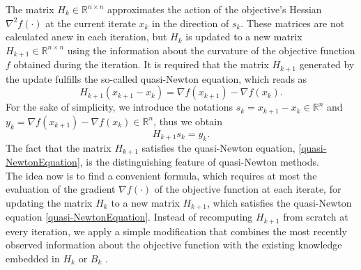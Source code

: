 The matrix $H_k \in \mathbb{R}^{n \times n}$ approximates the action of the objective's Hessian $\nabla^{2} f(\cdot)$ at the current iterate $x_k$ in the direction of $s_k$. These matrices are not calculated anew in each iteration, but $H_k$ is updated to a new matrix $H_{k+1} \in \mathbb{R}^{n \times n}$ using the information about the curvature of the objective function $f$ obtained during the iteration. It is required that the matrix $H_{k+1}$ generated by the update fulfills the so-called quasi-Newton equation, which reads as 
\begin{equation*}
    H_{k+1} (x_{k+1} - x_k) = \nabla f(x_{k+1}) - \nabla f(x_k).
\end{equation*}
For the sake of simplicity, we introduce the notations $s_k = x_{k+1} - x_k \in \mathbb{R}^n$ and $y_k = \nabla f(x_{k+1}) - \nabla f(x_k) \in \mathbb{R}^n$, thus we obtain
\begin{equation}\label{quasi-NewtonEquation}
    H_{k+1} s_k = y_k.
\end{equation}
The fact that the matrix $H_{k+1}$ satisfies the quasi-Newton equation, \cref{quasi-NewtonEquation}, is the distinguishing feature of quasi-Newton methods. \\
The idea now is to find a convenient formula, which requires at most the evaluation of the gradient $\nabla f(\cdot)$ of the objective function at each iterate, for updating the matrix $H_k$ to a new matrix $H_{k+1}$, which satisfies the quasi-Newton equation \cref{quasi-NewtonEquation}. Instead of recomputing $H_{k+1}$ from scratch at every iteration, we apply a simple modification that combines the most recently observed information about the objective function with the existing knowledge embedded in $H_k$ or $B_k$ \cite[p.~139]{NocedalWright:2006}. \\

